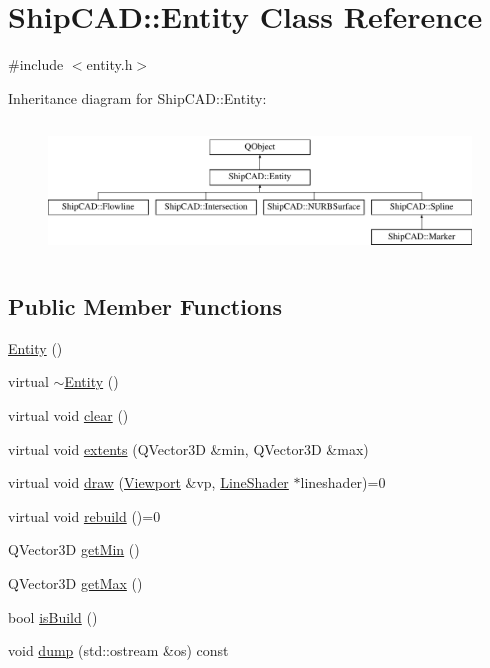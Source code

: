 \hypertarget{classShipCAD_1_1Entity}{\section{Ship\-C\-A\-D\-:\-:Entity Class Reference}
\label{classShipCAD_1_1Entity}
}


{\ttfamily \#include $<$entity.\-h$>$}

Inheritance diagram for Ship\-C\-A\-D\-:\-:Entity\-:\begin{figure}[H]
\begin{center}
\leavevmode
\includegraphics[height=3.589744cm]{classShipCAD_1_1Entity}
\end{center}
\end{figure}
\subsection*{Public Member Functions}
\begin{DoxyCompactItemize}
\item 
\hyperlink{classShipCAD_1_1Entity_a980f368aa07ce358583982821533a54a}{Entity} ()
\item 
virtual \hyperlink{classShipCAD_1_1Entity_a0fe3f9f7c8875a85afb214c8ebd75604}{$\sim$\-Entity} ()
\item 
virtual void \hyperlink{classShipCAD_1_1Entity_a998d0e5d360371046fd5835ba1e0877a}{clear} ()
\item 
virtual void \hyperlink{classShipCAD_1_1Entity_a08e8e53770c85002afa45f46e7bf10f8}{extents} (Q\-Vector3\-D \&min, Q\-Vector3\-D \&max)
\item 
virtual void \hyperlink{classShipCAD_1_1Entity_aa62e306d991140dcd564360f8f6e7539}{draw} (\hyperlink{classShipCAD_1_1Viewport}{Viewport} \&vp, \hyperlink{classShipCAD_1_1LineShader}{Line\-Shader} $\ast$lineshader)=0
\item 
virtual void \hyperlink{classShipCAD_1_1Entity_a2571654319df6ad6841a437be7a75395}{rebuild} ()=0
\item 
Q\-Vector3\-D \hyperlink{classShipCAD_1_1Entity_a759d6dedd36bf6562fbf36e816d9a5af}{get\-Min} ()
\item 
Q\-Vector3\-D \hyperlink{classShipCAD_1_1Entity_a3af98adafb45eb573675a8ccc44fe14e}{get\-Max} ()
\item 
bool \hyperlink{classShipCAD_1_1Entity_a131cd27d923ba1d2658528b679b9a90c}{is\-Build} ()
\item 
void \hyperlink{classShipCAD_1_1Entity_a395d7573df06482d9deaecdc87d46944}{dump} (std\-::ostream \&os) const 
\end{DoxyCompactItemize}
